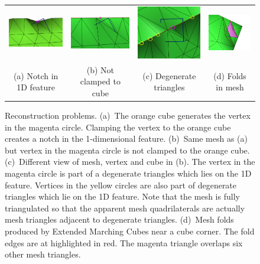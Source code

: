 
\begin{figure}
\centering
\begin{tabular}{cccc}
\includegraphics[width=1.2in]{images/cubeA_notch} \qquad &
\qquad
\includegraphics[width=1.2in]{images/cubeA_no_clamp.eps}
\qquad &
\qquad
\includegraphics[width=1.2in]{images/cubeA_degen.eps}
\qquad &
\qquad
\includegraphics[width=1.2in]{images/mesh_fold_EMC.eps} \\
(a) Notch in 1D feature & (b) Not clamped to cube
  & (c) Degenerate triangles & (d) Folds in mesh \\
\end{tabular}
\caption{Reconstruction problems.
(a)~The orange cube generates the vertex in the magenta circle.
Clamping the vertex to the orange cube creates a notch 
in the 1-dimensional feature.
(b)~Same mesh as (a) but vertex in the magenta circle is not
clamped to the orange cube.
(c)~Different view of mesh, vertex and cube in (b).
The vertex in the magenta circle is part of a degenerate triangles
which lies on the 1D feature.
Vertices in the yellow circles are also part of degenerate triangles
which lie on the 1D feature.
Note that the mesh is fully triangulated so that the apparent
mesh quadrilaterals are actually mesh triangles adjacent 
to degenerate triangles.
(d)~Mesh folds produced by Extended Marching Cubes near a cube corner.
The fold edges are at highlighted in red.
The magenta triangle overlaps six other mesh triangles.}
\label{fig:problems}
\end{figure}


